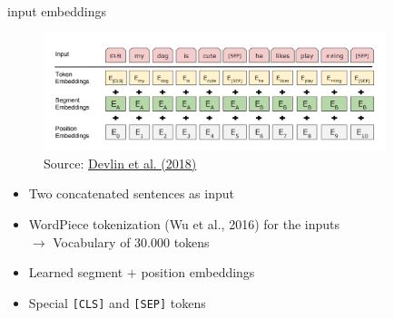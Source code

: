 
\begin{vbframe}{input embeddings}

\begin{figure}
	\centering
	\includegraphics[width = 10cm]{figure/bert-input.png}\\ 
	\footnotesize{Source:} \href{https://arxiv.org/pdf/1810.04805.pdf}{Devlin et al. (2018)}
\end{figure}

\begin{itemize}
	\item Two concatenated sentences as input
	\item WordPiece tokenization (Wu et al., 2016) for the inputs\\
			$\rightarrow$ Vocabulary of 30.000 tokens
	\item Learned segment $+$ position embeddings
	\item Special \texttt{[CLS]} and \texttt{[SEP]} tokens
\end{itemize}

\end{vbframe}


\endlecture

